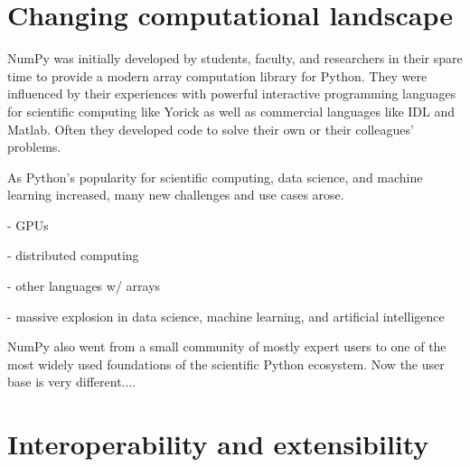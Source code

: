 \section*{Changing computational landscape}



NumPy was initially developed by students, faculty, and researchers in their
spare time to provide a modern array computation library for Python.
They were influenced by their experiences with powerful interactive programming
languages for scientific computing like Yorick \cite{munro1995using} as well
as commercial languages like IDL and Matlab.
Often they developed code to solve their own or their colleagues' problems.

As Python's popularity for scientific computing, data science, and machine
learning increased, many new challenges and use cases arose.

- GPUs

- distributed computing

- other languages w/ arrays

- massive explosion in data science, machine learning, and artificial intelligence

NumPy also went from a small community of mostly expert users to
one of the most widely used foundations of the scientific Python
ecosystem.
Now the user base is very different....

\section*{Interoperability and extensibility}


